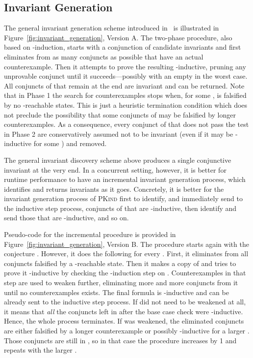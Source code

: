 \documentclass[submission,copyright,creativecommons]{eptcs}
\newcommand{\PKind}{\textrm{\textsc{PKind}}\xspace}
\begin{document}
\subsection{Invariant Generation}

The general invariant generation scheme introduced in~\cite{Kahsai-Ge-Tinelli-10}
is illustrated in Figure~\ref{fig:invariant_generation}, Version A.
The two-phase procedure, also based on -induction,
starts with a conjunction  of candidate invariants
and first eliminates from  as many conjuncts as possible that have 
an actual counterexample.
Then it attempts to prove the resulting  -inductive,
pruning any unprovable conjunct until it succeeds---possibly with an empty 
in the worst case.
All conjuncts of  that remain at the end are invariant and can be returned.
Note that in Phase 1 the search for counterexamples stops when,
for some ,  is falsified by no -reachable states.  This is
just a heuristic termination condition which does not preclude the
possibility that some conjuncts of  may be falsified by longer
counterexamples.  As a consequence, every conjunct of  that does
not pass the test in Phase 2 are conservatively assumed not to be
invariant (even if it may be -inductive for some ) and
removed.

The general invariant discovery scheme above produces a
single conjunctive invariant at the very end.
In a concurrent setting, however, it is better for runtime performance 
to have an incremental invariant generation process, 
which identifies and returns invariants as it goes.
Concretely, it is better for the invariant generation process of \PKind
first to identify, and immediately send to the inductive step process,
conjuncts of  that are -inductive, then identify and send
those that are -inductive, and so on.

Pseudo-code for the incremental procedure is provided 
in Figure~\ref{fig:invariant_generation}, Version B.
The procedure starts again with the conjecture
.
However, it does the following for every .
First, it eliminates from  all conjuncts falsified by a -reachable state. 
Then it makes a copy  of  and tries to prove it -inductive
by checking the -induction step on .
Counterexamples in that step are used to weaken  further,
eliminating more and more conjuncts from it 
until no counterexamples exists. 
The final formula  is -inductive and can be already sent
to the inductive step process.
If  did not need to be weakened at all, it means that 
\emph{all} the conjuncts left in  after the base case check 
were -inductive.
Hence, the whole process terminates.
If  was weakened, the eliminated conjuncts 
are either falsified by a longer counterexample or 
possibly -inductive for a larger .
Those conjuncts are still in , so in that case 
the procedure increases  by 1 and repeats with the larger .
\end{document}
